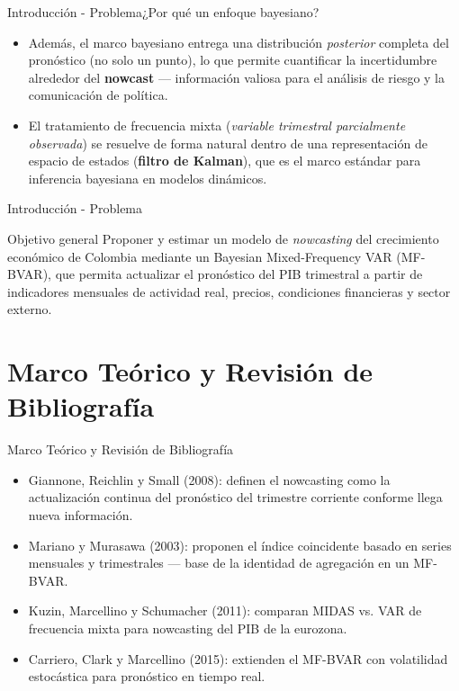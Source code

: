 \documentclass{beamer}
\begin{document}
\begin{frame}{Introducción - Problema}{¿Por qué un enfoque bayesiano?}
\begin{itemize}\justifying
	\item Además, el marco bayesiano entrega una distribución \textit{posterior} completa del pronóstico (no solo un punto), lo que permite cuantificar la incertidumbre alrededor del \textbf{nowcast} — información valiosa para el análisis de riesgo y la comunicación de política. \pause
	\item El tratamiento de frecuencia mixta (\textit{variable trimestral parcialmente observada}) se resuelve de forma natural dentro de una representación de espacio de estados (\textbf{filtro de Kalman}), que es el marco estándar para inferencia bayesiana en modelos dinámicos.
\end{itemize}
\end{frame}

\begin{frame}{Introducción - Problema}
\begin{block}{Objetivo general}\justifying
Proponer y estimar un modelo de \textit{nowcasting} del crecimiento económico de Colombia mediante un Bayesian Mixed-Frequency VAR (MF-BVAR), que permita actualizar el pronóstico del PIB trimestral a partir de indicadores mensuales de actividad real, precios, condiciones financieras y sector externo.
\end{block}
\end{frame}



\section{Marco Teórico y Revisión de Bibliografía}

\begin{frame}{Marco Teórico y Revisión de Bibliografía}{}
\begin{itemize}\justifying
	\item \textcolor[rgb]{0,0.58,0}{Giannone, Reichlin y Small (2008)}: definen el nowcasting como la actualización continua del pronóstico del trimestre corriente conforme llega nueva información.
	\item \textcolor[rgb]{0.92,0.5,0.4}{Mariano y Murasawa (2003)}: proponen el índice coincidente basado en series mensuales y trimestrales — base de la identidad de agregación en un MF-BVAR.
	\item \textcolor[rgb]{0.92,0.5,0.4}{Kuzin, Marcellino y Schumacher (2011)}: comparan MIDAS vs. VAR de frecuencia mixta para nowcasting del PIB de la eurozona.
	\item \textcolor[rgb]{0.92,0.5,0.4}{Carriero, Clark y Marcellino (2015)}: extienden el MF-BVAR con volatilidad estocástica para pronóstico en tiempo real.
\end{itemize}
\end{frame}
\end{document}
